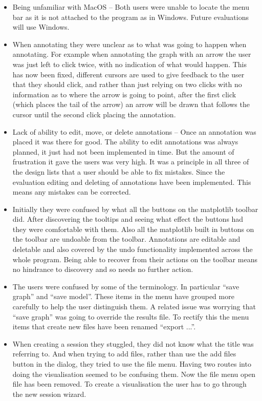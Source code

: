 \begin{itemize}
\item Being unfamiliar with MacOS -- Both users were unable to locate the menu bar as it is not attached to the program as in Windows.  Future evaluations will use Windows.
\item When annotating they were unclear as to what was going to happen when annotating.  For example when annotating the graph with an arrow the user was just left to click twice, with no indication of what would happen.  This has now been fixed, different cursors are used to give feedback to the user that they should click, and rather than just relying on two clicks with no information as to where the arrow is going to point, after the first click (which places the tail of the arrow) an arrow will be drawn that follows the cursor until the second click placing the annotation.
\item Lack of ability to edit, move, or delete annotations -- Once an annotation was placed it was there for good.  The ability to edit annotations was always planned, it just had not been implemented in time.  But the amount of frustration it gave the users was very high.  It was a principle in all three of the design lists that a user should be able to fix mistakes.  Since the evaluation editing and deleting of annotations have been implemented.  This means any mistakes can be corrected.
\item Initially they were confused by what all the buttons on the matplotlib toolbar did.  After discovering the tooltips and seeing what effect the buttons had they were comfortable with them.  Also all the matplotlib built in buttons on the toolbar are undoable from the toolbar.  Annotations are editable and deletable and also covered by the undo functionality implemented across the whole program.  Being able to recover from their actions on the toolbar means no hindrance to discovery and so needs no further action.
\item The users were confused by some of the terminology.  In particular ``save graph'' and ``save model''.  These items in the menu have grouped more carefully to help the user distinguish them.  A related issue was worrying that ``save graph'' was going to override the results file.  To rectify this the menu items that create new files have been renamed ``export ...''.
\item When creating a session they stuggled, they did not know what the title was referring to.  And when trying to add files, rather than use the add files button in the dialog, they tried to use the file menu.  Having two routes into doing the visualisation seemed to be confusing them.  Now the file menu open file has been removed.  To create a visualisation the user has to go through the new session wizard.

\end{itemize}
